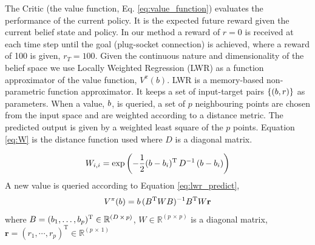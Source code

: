 

% 
%


The Critic (the value function, Eq. \ref{eq:value_function}) evaluates 
the performance of the current policy. It is the expected future reward given the current 
belief state and policy.
In our method a reward of $r=0$ is received at each time step
until the goal (plug-socket connection) is achieved, where a reward of 100 is given, $r_{T}=100$.
Given the continuous nature and dimensionality of the belief space we use Locally Weighted Regression \cite{Atkeson97locallyweighted}
(LWR) as a function approximator of the value function, $V^{\pi}(b)$. LWR is a memory-based non-parametric function 
approximator. It keeps a set of input-target pairs $\{(b,r)\}$ as parameters. When a value, $b$, is 
queried, a set of $p$ neighbouring points are chosen from the input space and are 
weighted according to a distance metric. The predicted output is given by a weighted 
least square of the $p$ points. Equation \ref{eq:W} is the distance function used where 
$D$ is a diagonal matrix.

\begin{equation}\label{eq:W}
 W_{i,i}  = \exp\left(-\frac{1}{2}(b - b_i)^{\mathrm{T}}\, D^{-1} \, (b - b_i) \right)
\end{equation}
A new value is queried according to Equation \ref{eq:lwr_predict},
\begin{equation}\label{eq:lwr_predict}
  V^{\pi}(b) = b \,(B^{\mathrm{T}} W B)^{-1} B^{\mathrm{T}} W \mathbf{r}
\end{equation}
where $B = (b_1,\dots,b_p)^{\mathrm{T}} \in \mathbb{R}^{(D\, \times\, p)}$, $W \in \mathbb{R}^{(p\, \times\, p)}$ is
a diagonal matrix, $\mathbf{r} = (r_1,\cdots,r_p)^{\mathrm{T}} \in \mathbb{R}^{(p\, \times\, 1)}$

